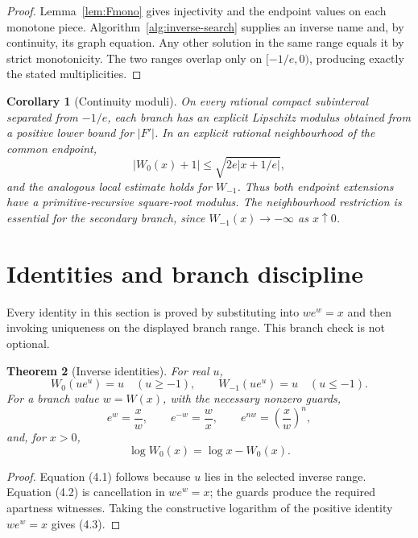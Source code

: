 \documentclass[11pt]{article}
\newtheorem{theorem}{Theorem}[section]
\newtheorem{corollary}[theorem]{Corollary}
\theoremstyle{definition}
\newcommand{\Wz}{W_0}
\newcommand{\Wm}{W_{-1}}
\newcommand{\abs}[1]{\left|#1\right|}
\begin{document}
\begin{proof}
Lemma~\ref{lem:Fmono} gives injectivity and the endpoint values on each monotone
piece.  Algorithm~\ref{alg:inverse-search} supplies an inverse name and, by
continuity, its graph equation.  Any other solution in the same range equals it
by strict monotonicity.  The two ranges overlap only on \([-1/e,0)\), producing
exactly the stated multiplicities.
\end{proof}

\begin{corollary}[Continuity moduli]\label{cor:Wmoduli}
On every rational compact subinterval separated from \(-1/e\), each branch has
an explicit Lipschitz modulus obtained from a positive lower bound for
\(\abs{F'}\).  In an explicit rational neighbourhood of the common endpoint,
\[
 \abs{\Wz(x)+1}\le\sqrt{2e\abs{x+1/e}},
\]
and the analogous local estimate holds for \(\Wm\).  Thus both endpoint
extensions have a primitive-recursive square-root modulus.  The neighbourhood
restriction is essential for the secondary branch, since \(\Wm(x)\to-\infty\)
as \(x\uparrow0\).
\end{corollary}

\section{Identities and branch discipline}\label{sec:identities}

Every identity in this section is proved by substituting into \(we^w=x\) and
then invoking uniqueness on the displayed branch range.  This branch check is
not optional.

\begin{theorem}[Inverse identities]\label{thm:inverse-identities}
For real \(u\),
\[
 \Wz(ue^u)=u\quad(u\ge-1),
 \qquad
 \Wm(ue^u)=u\quad(u\le-1).
 \tag{4.1}
\]
For a branch value \(w=W(x)\), with the necessary nonzero guards,
\[
 e^w=\frac{x}{w},\qquad e^{-w}=\frac{w}{x},\qquad
 e^{nw}=\left(\frac{x}{w}\right)^n,
 \tag{4.2}
\]
and, for \(x>0\),
\[
 \log \Wz(x)=\log x-\Wz(x).
 \tag{4.3}
\]
\end{theorem}

\begin{proof}
Equation (4.1) follows because \(u\) lies in the selected inverse range.
Equation (4.2) is cancellation in \(we^w=x\); the guards produce the required
apartness witnesses.  Taking the constructive logarithm of the positive
identity \(we^w=x\) gives (4.3).
\end{proof}
\end{document}
